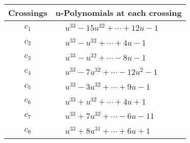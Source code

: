 \documentclass[1p]{elsarticle_modified}
\theoremstyle{definition}
\begin{document}
\begin{tabular}{m{50pt}|m{274pt}}
Crossings & \hspace{64pt}u-Polynomials at each crossing \\
\hline $$\begin{aligned}c_{1}\end{aligned}$$&$\begin{aligned}
&u^{33}-15 u^{32}+\cdots+12 u-1
\end{aligned}$\\
\hline $$\begin{aligned}c_{2}\end{aligned}$$&$\begin{aligned}
&u^{33}- u^{32}+\cdots+4 u-1
\end{aligned}$\\
\hline $$\begin{aligned}c_{3}\end{aligned}$$&$\begin{aligned}
&u^{33}- u^{32}+\cdots-8 u-1
\end{aligned}$\\
\hline $$\begin{aligned}c_{4}\end{aligned}$$&$\begin{aligned}
&u^{33}-7 u^{32}+\cdots-12 u^2-1
\end{aligned}$\\
\hline $$\begin{aligned}c_{5}\end{aligned}$$&$\begin{aligned}
&u^{33}-3 u^{32}+\cdots+9 u-1
\end{aligned}$\\
\hline $$\begin{aligned}c_{6}\end{aligned}$$&$\begin{aligned}
&u^{33}+u^{32}+\cdots+4 u+1
\end{aligned}$\\
\hline $$\begin{aligned}c_{7}\end{aligned}$$&$\begin{aligned}
&u^{33}+7 u^{32}+\cdots-6 u-11
\end{aligned}$\\
\hline $$\begin{aligned}c_{8}\end{aligned}$$&$\begin{aligned}
&u^{33}+8 u^{31}+\cdots+6 u+1
\end{aligned}$\\

\end{tabular}
\end{document}
